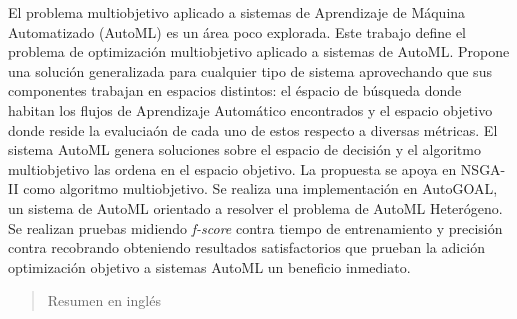 \begin{resumen}
	El problema multiobjetivo aplicado a sistemas de Aprendizaje de M\'aquina Automatizado (AutoML) es un \'area poco explorada. Este trabajo define el problema de optimizaci\'on multiobjetivo aplicado a sistemas de AutoML. Propone una soluci\'on generalizada para cualquier tipo de sistema aprovechando que sus componentes trabajan en espacios distintos: el \'espacio de b\'usqueda donde habitan los flujos de Aprendizaje Autom\'atico encontrados y el espacio objetivo donde reside la evalucia\'on de cada uno de estos respecto a diversas m\'etricas.
    El sistema AutoML genera soluciones sobre el espacio de decisi\'on y el algoritmo multiobjetivo las ordena en el espacio objetivo.
    La propuesta se apoya en NSGA-II como algoritmo multiobjetivo. 
    Se realiza una implementaci\'on en AutoGOAL, un sistema de AutoML orientado a resolver el problema de AutoML Heter\'ogeno. Se realizan pruebas midiendo \textit{f-score} contra tiempo de entrenamiento y precisi\'on contra recobrando obteniendo resultados satisfactorios que prueban la adici\'on optimizaci\'on objetivo a sistemas AutoML un beneficio inmediato.
\end{resumen}

\begin{abstract}
	Resumen en inglés
\end{abstract}
